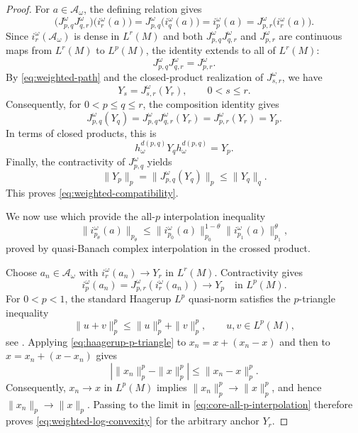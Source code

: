 \documentclass[12pt]{article}
\numberwithin{equation}{section}
\theoremstyle{definition}
\theoremstyle{remark}
\newcommand{\?}{\overset{?}{=}}
\begin{document}
\begin{proof}
For \(a\in\mathcal A_\omega\), the defining relation gives
\[
  \bigl(J^\omega_{p,q} J^\omega_{q,r}\bigr)
  \bigl(i_r^\omega(a)\bigr)
  =
  J^\omega_{p,q}\bigl(i_q^\omega(a)\bigr)
  =
  i_p^\omega(a)
  =
  J^\omega_{p,r}\bigl(i_r^\omega(a)\bigr).
\]
Since \(i_r^\omega(\mathcal A_\omega)\) is dense in \(L^r(M)\) and both
\(J^\omega_{p,q} J^\omega_{q,r}\) and \(J^\omega_{p,r}\) are
continuous maps from \(L^r(M)\) to \(L^p(M)\), the identity extends to
all of \(L^r(M)\):
\begin{equation}
  J^\omega_{p,q} J^\omega_{q,r}
  =
  J^\omega_{p,r}.
  \label{eq:downward-composition}
\end{equation}
By \eqref{eq:weighted-path} and the closed-product realization of
\(J^\omega_{s,r}\), we have
\[
  Y_s=J^\omega_{s,r}(Y_r),
  \qquad 0<s\le r.
\]
Consequently, for \(0<p\le q\le r\), the composition identity gives
\[
  J^\omega_{p,q}(Y_q)
  =
  J^\omega_{p,q}J^\omega_{q,r}(Y_r)
  =
  J^\omega_{p,r}(Y_r)
  =
  Y_p.
\]
In terms of closed products, this is
\[
  h_\omega^{d(p,q)}Y_qh_\omega^{d(p,q)}=Y_p.
\]
Finally, the contractivity of \(J^\omega_{p,q}\) yields
\[
  \|Y_p\|_p
  =
  \|J^\omega_{p,q}(Y_q)\|_p
  \leq
  \|Y_q\|_q.
\]
This proves 
\eqref{eq:weighted-compatibility}.  

We now use \cite[Theorem~4.1 and Corollary~4.3]{Gu:2019jfc} which provide the all-$p$ interpolation inequality
\begin{equation}
  \|i_{p_\theta}^\omega(a)\|_{p_\theta}
  \leq
  \|i_{p_0}^\omega(a)\|_{p_0}^{1-\theta}
  \|i_{p_1}^\omega(a)\|_{p_1}^{\theta},
  \label{eq:core-all-p-interpolation}
\end{equation}
proved by quasi-Banach complex interpolation in the crossed product.

Choose $a_n\in\mathcal A_\omega$ with
$i_r^\omega(a_n)\to Y_r$ in $L^r(M)$.  Contractivity gives
\begin{equation}
  i_p^\omega(a_n)
  =J_{p,r}^\omega(i_r^\omega(a_n))
  \longrightarrow Y_p
  \quad\text{in }L^p(M).
  \label{eq:core-approximation-all-p}
\end{equation}
For $0<p<1$, the standard Haagerup $L^p$ quasi-norm satisfies the
$p$-triangle inequality
\begin{equation}
  \|u+v\|_p^p
  \leq
  \|u\|_p^p+\|v\|_p^p,
  \qquad u,v\in L^p(M),
  \label{eq:haagerup-p-triangle}
\end{equation}
see \cite[Theorem~4.9(iii)]{Fack:1986ezo}.  Applying
\eqref{eq:haagerup-p-triangle} to
$x_n=x+(x_n-x)$ and then to $x=x_n+(x-x_n)$ gives
\begin{equation}
  \left|\|x_n\|_p^p-\|x\|_p^p\right|
  \leq
  \|x_n-x\|_p^p.
  \label{eq:p-power-continuity}
\end{equation}
Consequently, $x_n\to x$ in $L^p(M)$ implies
$\|x_n\|_p^p\to\|x\|_p^p$, and hence
$\|x_n\|_p\to\|x\|_p$.
Passing to the limit in \eqref{eq:core-all-p-interpolation} therefore
proves \eqref{eq:weighted-log-convexity} for the arbitrary anchor $Y_r$.


\end{proof}
\end{document}
